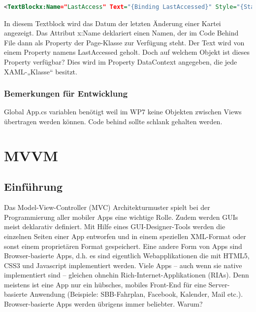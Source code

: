 \documentclass[a4paper,10pt]{scrreprt}
\begin{document}
\begin{lstlisting}[caption=Data Binding Example,language=xml]
 <TextBlockx:Name="LastAccess" Text="{Binding LastAccessed}" Style="{StaticResource contentStyle}"/>
\end{lstlisting}
In diesem Textblock wird das Datum der letzten Änderung einer Kartei angezeigt. Das Attribut x:Name deklariert
einen Namen, der im Code Behind File dann als Property der Page-Klasse zur Verfügung steht. Der Text wird von
einem Property namens LastAccessed geholt. Doch auf welchem Objekt ist dieses Property verfügbar? Dies wird
im Property DataContext angegeben, die jede XAML-„Klasse“ besitzt.


\subsection{Bemerkungen für Entwicklung}
Global App.cs variablen benötigt weil im WP7 keine Objekten zwischen Views übertragen werden können.
Code behind sollte schlank gehalten werden.

\chapter{MVVM}
\section{Einführung}
Das Model-View-Controller (MVC) Architekturmuster spielt bei der Programmierung aller mobiler Apps eine
wichtige Rolle. Zudem werden GUIs meist deklarativ definiert. Mit Hilfe eines GUI-Designer-Tools werden die
einzelnen Seiten einer App entworfen und in einem speziellen XML-Format oder sonst einem proprietären
Format gespeichert. Eine andere Form von Apps sind Browser-basierte Apps, d.h. es sind eigentlich
Webapplikationen die mit HTML5, CSS3 und Javascript implementiert werden.
Viele Apps – auch wenn sie native implementiert sind – gleichen ohnehin Rich-Internet-Applikationen (RIAs).
Denn meistens ist eine App nur ein hübsches, mobiles Front-End für eine Server-basierte Anwendung (Beispiele:
SBB-Fahrplan, Facebook, Kalender, Mail etc.). Browser-basierte Apps werden übrigens immer beliebter.
Warum?
\end{document}
